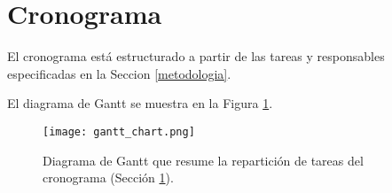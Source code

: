\section{Cronograma}
\label{cronograma}

El cronograma est\'a estructurado a partir de las tareas y
responsables especificadas en la Seccion \ref{metodologia}.  

El diagrama de Gantt se muestra en la Figura \ref{gantt}.

\begin{figure}
\begin{center}
\texttt{[image: gantt\_chart.png]}
\end{center}
\caption{Diagrama de Gantt que resume la repartici\'on de tareas del
  cronograma (Secci\'on \ref{cronograma}). 
\label{gantt}}
\end{figure}


